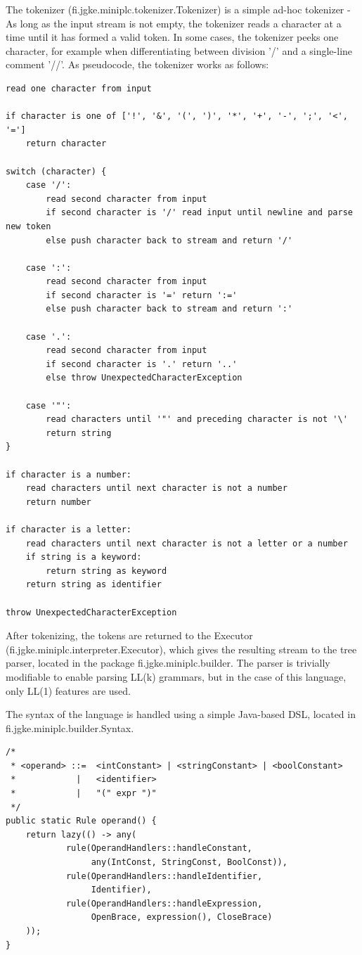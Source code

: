 \documentclass{article}
\begin{document}
The tokenizer (fi.jgke.miniplc.tokenizer.Tokenizer) is a simple ad-hoc
tokenizer - As long as the input stream is not empty, the tokenizer reads a
character at a time until it has formed a valid token. In some cases, the
tokenizer peeks one character, for example when differentiating between
division '/' and a single-line comment '//'.
As pseudocode, the tokenizer works as follows:
\begin{verbatim}
read one character from input

if character is one of ['!', '&', '(', ')', '*', '+', '-', ';', '<', '=']
    return character

switch (character) {
    case '/':
        read second character from input
        if second character is '/' read input until newline and parse new token
        else push character back to stream and return '/'

    case ':':
        read second character from input
        if second character is '=' return ':='
        else push character back to stream and return ':'

    case '.':
        read second character from input
        if second character is '.' return '..'
        else throw UnexpectedCharacterException

    case '"':
        read characters until '"' and preceding character is not '\'
        return string
}

if character is a number:
    read characters until next character is not a number
    return number

if character is a letter:
    read characters until next character is not a letter or a number
    if string is a keyword:
        return string as keyword
    return string as identifier

throw UnexpectedCharacterException
\end{verbatim}
\newpage

After tokenizing, the tokens are returned to the Executor
(fi.jgke.miniplc.interpreter.Executor), which gives the resulting stream to the
tree parser, located in the package fi.jgke.miniplc.builder. The parser is
trivially modifiable to enable parsing LL(k) grammars, but in the case of this
language, only LL(1) features are used.

The syntax of the language is handled using a simple Java-based DSL, located in
fi.jgke.miniplc.builder.Syntax.

\begin{verbatim}
/*
 * <operand> ::=  <intConstant> | <stringConstant> | <boolConstant>
 *            |   <identifier>
 *            |   "(" expr ")"
 */
public static Rule operand() {
    return lazy(() -> any(
            rule(OperandHandlers::handleConstant,
                 any(IntConst, StringConst, BoolConst)),
            rule(OperandHandlers::handleIdentifier,
                 Identifier),
            rule(OperandHandlers::handleExpression,
                 OpenBrace, expression(), CloseBrace)
    ));
}
\end{verbatim}
\end{document}
